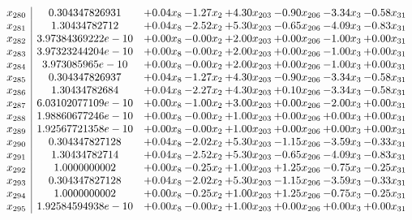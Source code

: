 \documentclass[8pt]{article}
\begin{document}
\[\begin{array}{c| c c@{\hskip 2pt} c@{\hskip 2pt} c@{\hskip 2pt} c@{\hskip 2pt} c@{\hskip 2pt} c@{\hskip 2pt} }
 x_{280}   &  0.304347826931 & +  0.04 x_{8} & -1.27 x_{2} & +  4.30 x_{203} & -0.90 x_{206} & -3.34 x_{3} & -0.58 x_{31}\\
 x_{281}   &  1.30434782712 & +  0.04 x_{8} & -2.52 x_{2} & +  5.30 x_{203} & -0.65 x_{206} & -4.09 x_{3} & -0.83 x_{31}\\
 x_{282}   &  3.97384369222e-10 & +  0.00 x_{8} & -0.00 x_{2} & +  2.00 x_{203} & +  0.00 x_{206} & -1.00 x_{3} & +  0.00 x_{31}\\
 x_{283}   &  3.97323244204e-10 & +  0.00 x_{8} & -0.00 x_{2} & +  2.00 x_{203} & +  0.00 x_{206} & -1.00 x_{3} & +  0.00 x_{31}\\
 x_{284}   &  3.973085965e-10 & +  0.00 x_{8} & -0.00 x_{2} & +  2.00 x_{203} & +  0.00 x_{206} & -1.00 x_{3} & +  0.00 x_{31}\\
 x_{285}   &  0.304347826937 & +  0.04 x_{8} & -1.27 x_{2} & +  4.30 x_{203} & -0.90 x_{206} & -3.34 x_{3} & -0.58 x_{31}\\
 x_{286}   &  1.30434782684 & +  0.04 x_{8} & -2.27 x_{2} & +  4.30 x_{203} & +  0.10 x_{206} & -3.34 x_{3} & -0.58 x_{31}\\
 x_{287}   &  6.03102077109e-10 & +  0.00 x_{8} & -1.00 x_{2} & +  3.00 x_{203} & +  0.00 x_{206} & -2.00 x_{3} & +  0.00 x_{31}\\
 x_{288}   &  1.98860677246e-10 & +  0.00 x_{8} & -0.00 x_{2} & +  1.00 x_{203} & +  0.00 x_{206} & +  0.00 x_{3} & +  0.00 x_{31}\\
 x_{289}   &  1.92567721358e-10 & +  0.00 x_{8} & -0.00 x_{2} & +  1.00 x_{203} & +  0.00 x_{206} & +  0.00 x_{3} & +  0.00 x_{31}\\
 x_{290}   &  0.304347827128 & +  0.04 x_{8} & -2.02 x_{2} & +  5.30 x_{203} & -1.15 x_{206} & -3.59 x_{3} & -0.33 x_{31}\\
 x_{291}   &  1.30434782714 & +  0.04 x_{8} & -2.52 x_{2} & +  5.30 x_{203} & -0.65 x_{206} & -4.09 x_{3} & -0.83 x_{31}\\
 x_{292}   &  1.0000000002 & +  0.00 x_{8} & -0.25 x_{2} & +  1.00 x_{203} & +  1.25 x_{206} & -0.75 x_{3} & -0.25 x_{31}\\
 x_{293}   &  0.304347827128 & +  0.04 x_{8} & -2.02 x_{2} & +  5.30 x_{203} & -1.15 x_{206} & -3.59 x_{3} & -0.33 x_{31}\\
 x_{294}   &  1.0000000002 & +  0.00 x_{8} & -0.25 x_{2} & +  1.00 x_{203} & +  1.25 x_{206} & -0.75 x_{3} & -0.25 x_{31}\\
 x_{295}   &  1.92584594938e-10 & +  0.00 x_{8} & -0.00 x_{2} & +  1.00 x_{203} & +  0.00 x_{206} & +  0.00 x_{3} & +  0.00 x_{31}\\

\end{array}\]
\end{document}
